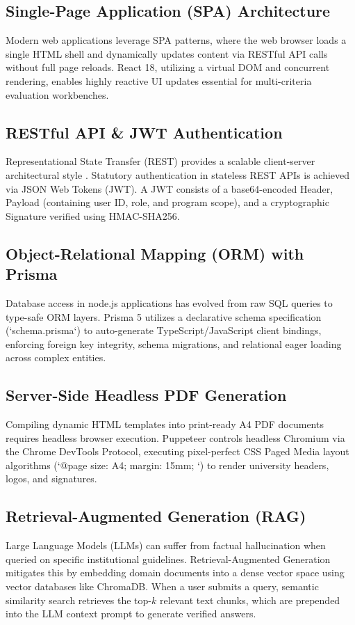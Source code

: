 \documentclass[12pt]{report}
\begin{document}
\subsection{Single-Page Application (SPA) Architecture}
Modern web applications leverage SPA patterns, where the web browser loads a single HTML shell and dynamically updates content via RESTful API calls without full page reloads. React 18, utilizing a virtual DOM and concurrent rendering, enables highly reactive UI updates essential for multi-criteria evaluation workbenches.

\subsection{RESTful API & JWT Authentication}
Representational State Transfer (REST) provides a scalable client-server architectural style \citep{fielding2000architectural}. Statutory authentication in stateless REST APIs is achieved via JSON Web Tokens (JWT). A JWT consists of a base64-encoded Header, Payload (containing user ID, role, and program scope), and a cryptographic Signature verified using HMAC-SHA256.

\subsection{Object-Relational Mapping (ORM) with Prisma}
Database access in node.js applications has evolved from raw SQL queries to type-safe ORM layers. Prisma 5 utilizes a declarative schema specification (`schema.prisma`) to auto-generate TypeScript/JavaScript client bindings, enforcing foreign key integrity, schema migrations, and relational eager loading across complex entities.

\subsection{Server-Side Headless PDF Generation}
Compiling dynamic HTML templates into print-ready A4 PDF documents requires headless browser execution. Puppeteer controls headless Chromium via the Chrome DevTools Protocol, executing pixel-perfect CSS Paged Media layout algorithms (`@page { size: A4; margin: 15mm; }`) to render university headers, logos, and signatures.

\subsection{Retrieval-Augmented Generation (RAG)}
Large Language Models (LLMs) can suffer from factual hallucination when queried on specific institutional guidelines. Retrieval-Augmented Generation \citep{lewis2020retrieval} mitigates this by embedding domain documents into a dense vector space using vector databases like ChromaDB. When a user submits a query, semantic similarity search retrieves the top-$k$ relevant text chunks, which are prepended into the LLM context prompt to generate verified answers.
\end{document}
